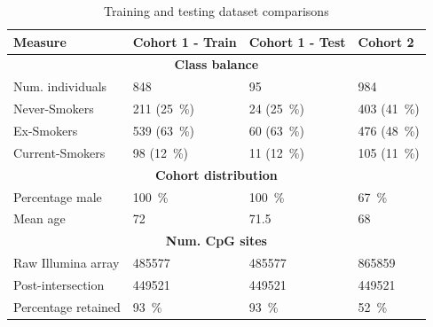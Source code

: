 \documentclass[draft]{article} %
\begin{document}
\begin{table}
    \caption{Training and testing dataset comparisons} \label{table:dataset-compare-internal}
    \begin{tabularx}{\textwidth}{X >{\raggedleft\arraybackslash}X >{\raggedleft\arraybackslash}X >{\raggedleft\arraybackslash}X}
        \toprule
        \textbf{Measure}    & \textbf{Cohort 1 - Train}     & \textbf{Cohort 1 - Test}     & \textbf{Cohort 2}             \\
        \midrule
        \multicolumn{4}{c}{\textbf{Class balance}}                                                                         \\
        \midrule
        Num. individuals    & \num{848}                     & \num{95}                     & \num{984}                     \\
        \addlinespace
        Never-Smokers       & \num{211} (\SI{25}{\percent}) & \num{24} (\SI{25}{\percent}) & \num{403} (\SI{41}{\percent}) \\
        \addlinespace
        Ex-Smokers          & \num{539} (\SI{63}{\percent}) & \num{60} (\SI{63}{\percent}) & \num{476} (\SI{48}{\percent}) \\
        \addlinespace
        Current-Smokers     & \num{98} (\SI{12}{\percent})  & \num{11} (\SI{12}{\percent}) & \num{105} (\SI{11}{\percent}) \\
        \midrule
        \multicolumn{4}{c}{\textbf{Cohort distribution}}                                                                   \\
        \midrule
        Percentage male     & \SI{100}{\percent}            & \SI{100}{\percent}           & \SI{67}{\percent}             \\
        Mean age            & \num{72}                      & \num{71.5}                   & \num{68}                      \\
        \midrule
        \multicolumn{4}{c}{\textbf{Num. CpG sites}}                                                                        \\
        \midrule
        Raw Illumina array  & \num{485577}                  & \num{485577}                 & \num{865859}                  \\
        Post-intersection   & \num{449521}                  & \num{449521}                 & \num{449521}                  \\
        Percentage retained & \SI{93}{\percent}             & \SI{93}{\percent}            & \SI{52}{\percent}             \\
        \bottomrule
    \end{tabularx}
\end{table}
\end{document}
